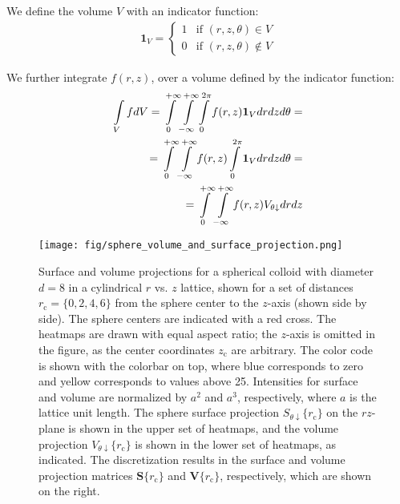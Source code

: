 \documentclass[10pt, a4paper]{article}
\begin{document}
\begin{multicols}{2}
We define the volume $V$ with an indicator function:
\begin{eqnarray}
    \bm{1}_V =
    \begin{cases}
        1 & \text{if } (r, z, \theta) \in V\\
        0 & \text{if } (r, z, \theta) \notin V
    \end{cases}
\end{eqnarray}

We further integrate $f(r,z)$, over a volume defined by the indicator function:
\begin{eqnarray}
    \label{eq:int_indicator_V}
    \begin{split}
        \int\limits_{V} f dV
        =\int\displaylimits_{0}^{+\infty} \int\displaylimits_{-\infty}^{+\infty} \int\displaylimits_{0}^{2\pi} f(r, z) \bm{1}_V  dr dz d\theta =\\
        =\int\displaylimits_{0}^{+\infty} \int\displaylimits_{-\infty}^{+\infty} f(r, z) \int\displaylimits_{0}^{2\pi}  \bm{1}_V dr dz d\theta =\\
        =\int\displaylimits_{0}^{+\infty} \int\displaylimits_{-\infty}^{+\infty} f(r, z)  V_{\theta \downarrow} dr dz
    \end{split}
\end{eqnarray}

\begin{figure}[H]
    \centering
    \texttt{[image: fig/sphere\_volume\_and\_surface\_projection.png]}
    \caption{
        Surface and volume projections for a spherical colloid with diameter $d = 8$ in a cylindrical $r$ vs. $z$ lattice, shown for a set of distances $r_{\text{c}} = \{0, 2, 4, 6\}$ from the sphere center to the $z$-axis (shown side by side).
        The sphere centers are indicated with a red cross.
        The heatmaps are drawn with equal aspect ratio; the $z$-axis is omitted in the figure, as the center coordinates $z_{\text{c}}$ are arbitrary.
        The color code is shown with the colorbar on top, where blue corresponds to zero and yellow corresponds to values above 25.
        Intensities for surface and volume are normalized by $a^2$ and $a^3$, respectively, where $a$ is the lattice unit length.
        The sphere surface projection $S_{\theta \downarrow}\{r_{\text{c}}\}$ on the $rz$-plane is shown in the upper set of heatmaps, and the volume projection $V_{\theta \downarrow}\{r_{\text{c}}\}$ is shown in the lower set of heatmaps, as indicated.
        The discretization results in the surface and volume projection matrices $\bm{S}\{r_{\text{c}}\}$ and $\bm{V}\{r_{\text{c}}\}$, respectively, which are shown on the right.
    }
    \label{fig:sphere_volume_and_surface_projection}
\end{figure}


\end{multicols}
\end{document}
